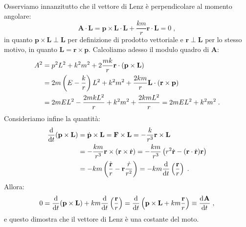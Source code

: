 Osserviamo innanzitutto che il vettore di Lenz è perpendicolare al momento angolare:
\begin{equation}
\mathbf{A}\cdot\mathbf{L}=\mathbf{p}\times\mathbf{L}\cdot\mathbf{L}+\frac{km}{r}\mathbf{r}\cdot\mathbf{L}=0\;,
\end{equation}
in quanto $\mathbf{p}\times \mathbf{L}\perp \mathbf{L}$ per definizione di prodotto vettoriale e $\mathbf{r}\perp \mathbf{L}$ per lo stesso motivo, in quanto $\mathbf{L}=\mathbf{r}\times\mathbf{p}$. Calcoliamo adesso il modulo quadro di $\mathbf{A}$:
\begin{align}
A^2&= p^2L^2+k^2m^2+2\frac{mk}{r}\mathbf{r}\cdot(\mathbf{p}\times\mathbf{L}) \notag \\
&= 2m\left(E-\frac{k}{r}\right)L^2+k^2m^2+\frac{2km}{r}\mathbf{L}\cdot (\mathbf{r}\times\mathbf{p}) \notag \\
&= 2mEL^2-\frac{2mkL^2}{r}+k^2m^2+\frac{2kmL^2}{r}=2mEL^2+k^2m^2\;.
\end{align}
Consideriamo infine la quantità:
\begin{align}
\frac{\mathrm{d}}{\mathrm{d}{t}}(\mathbf{p}\times\mathbf{L}) &= \dot{\mathbf{p}}\times\mathbf{L}=\mathbf{F}\times \mathbf{L}=-\frac{k}{r^3}\mathbf{r}\times\mathbf{L} \notag \\
&=-\frac{km}{r^3}\mathbf{r}\times(\mathbf{r}\times\dot{\mathbf{r}})=-\frac{km}{r^3}\left(r^2\dot{\mathbf{r}}-(\mathbf{r}\cdot\dot{\mathbf{r}})\mathbf{r}\right) \notag \\
&= -km\left(\frac{\dot{\mathbf{r}}}{r}-\mathbf{r}\frac{\dot{r}}{r^2}\right)=-km\frac{\mathrm{d}}{\mathrm{d}{t}}\left(\frac{\mathbf{r}}{r}\right)\;.
\end{align}
Allora:
\begin{equation}
0=\frac{\mathrm{d}}{\mathrm{d}{t}}(\mathbf{p}\times\mathbf{L})+km\frac{\mathrm{d}}{\mathrm{d}{t}}\left(\frac{\mathbf{r}}{r}\right)=\frac{\mathrm{d}}{\mathrm{d}{t}}\left(\mathbf{p}\times\mathbf{L}+km\frac{\mathbf{r}}{r}\right)\equiv \frac{\mathrm{d}^{}\mathbf{A}}{\mathrm{d}t^{}}\;,
\end{equation}
e questo dimostra che il vettore di Lenz è una costante del moto.
\pagebreak
